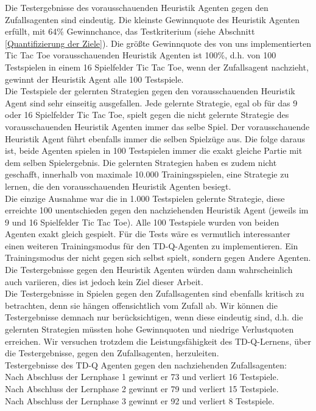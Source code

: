 Die Testergebnisse des vorausschauenden Heuristik Agenten gegen den Zufallsagenten sind eindeutig. Die kleinste Gewinnquote des Heuristik Agenten erfüllt, mit 64\% Gewinnchance, das Testkriterium (siehe Abschnitt \ref{Quantifizierung der Ziele}). Die größte Gewinnquote des von uns implementierten Tic Tac Toe vorausschauenden Heuristik Agenten ist 100\%, d.h. von 100 Testspielen in einem 16 Spielfelder Tic Tac Toe, wenn der Zufallsagent nachzieht, gewinnt der Heuristik Agent alle 100 Testspiele. \\

Die Testspiele der gelernten Strategien gegen den vorausschauenden Heuristik Agent sind sehr einseitig ausgefallen. Jede gelernte Strategie, egal ob für das 9 oder 16 Spielfelder Tic Tac Toe, spielt gegen die nicht gelernte Strategie des vorausschauenden Heuristik Agenten immer das selbe Spiel. Der vorausschauende Heuristik Agent führt ebenfalls immer die selben Spielzüge aus. Die folge daraus ist, beide Agenten spielen in 100 Testspielen immer die exakt gleiche Partie mit dem selben Spielergebnis. Die gelernten Strategien haben es zudem nicht geschafft, innerhalb von maximale 10.000 Trainingsspielen, eine Strategie zu lernen, die den vorausschauenden Heuristik Agenten besiegt. \\

Die einzige Ausnahme war die in 1.000 Testspielen gelernte Strategie, diese erreichte 100 unentschieden gegen den nachziehenden Heuristik Agent (jeweils im 9 und 16 Spielfelder Tic Tac Toe). Alle 100 Testspiele wurden von beiden Agenten exakt gleich gespielt. Für die Tests wäre es vermutlich interessanter einen weiteren Trainingsmodus für den TD-Q-Agenten zu implementieren. Ein Trainingsmodus der nicht gegen sich selbst spielt, sondern gegen Andere Agenten. Die Testergebnisse gegen den Heuristik Agenten würden dann wahrscheinlich auch variieren, dies ist jedoch kein Ziel dieser Arbeit. \\

Die Testergebnisse in Spielen gegen den Zufallsagenten sind ebenfalls kritisch zu betrachten, denn sie hängen offensichtlich vom Zufall ab. Wir können die Testergebnisse demnach nur berücksichtigen, wenn diese eindeutig sind, d.h. die gelernten Strategien müssten hohe Gewinnquoten und niedrige Verlustquoten erreichen. Wir versuchen trotzdem die Leistungsfähigkeit des TD-Q-Lernens, über die Testergebnisse, gegen den Zufallsagenten, herzuleiten. \\

Testergebnisse des TD-Q Agenten gegen den nachziehenden Zufallsagenten: \\
Nach Abschluss der Lernphase 1 gewinnt er 73 und verliert 16 Testspiele. \\
Nach Abschluss der Lernphase 2 gewinnt er 79 und verliert 15 Testspiele. \\ 
Nach Abschluss der Lernphase 3 gewinnt er 92 und verliert 8 Testspiele. \\

